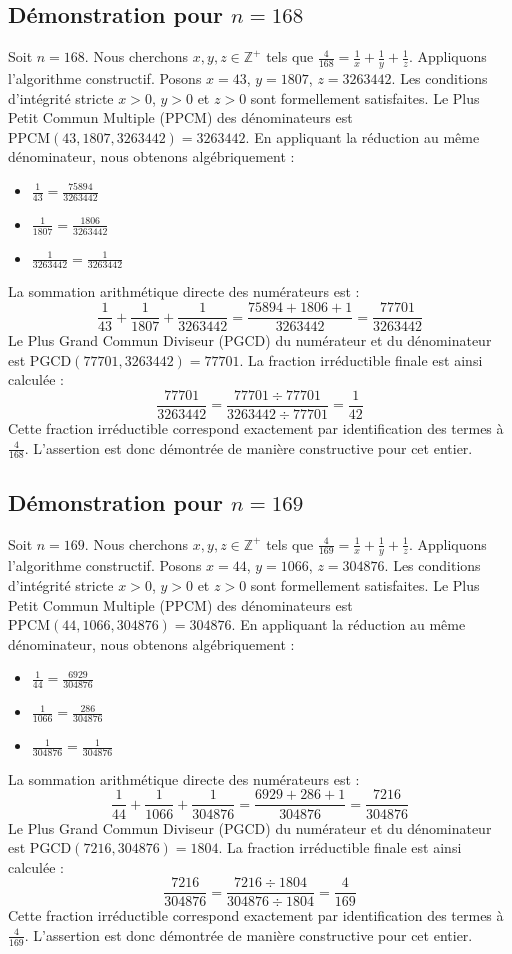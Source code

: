 \documentclass[11pt,a4paper]{article}
\begin{document}
\subsection{Démonstration pour $n = 168$}
Soit $n = 168$. Nous cherchons $x, y, z \in \mathbb{Z}^{+}$ tels que $\frac{4}{168} = \frac{1}{x} + \frac{1}{y} + \frac{1}{z}$.
Appliquons l'algorithme constructif. Posons $x = 43$, $y = 1807$, $z = 3263442$.
Les conditions d'intégrité stricte $x > 0$, $y > 0$ et $z > 0$ sont formellement satisfaites.
Le Plus Petit Commun Multiple (PPCM) des dénominateurs est $\text{PPCM}(43, 1807, 3263442) = 3263442$.
En appliquant la réduction au même dénominateur, nous obtenons algébriquement :
\begin{itemize}
    \item $\frac{1}{43} = \frac{75894}{3263442}$
    \item $\frac{1}{1807} = \frac{1806}{3263442}$
    \item $\frac{1}{3263442} = \frac{1}{3263442}$
\end{itemize}
La sommation arithmétique directe des numérateurs est :
$$ \frac{1}{43} + \frac{1}{1807} + \frac{1}{3263442} = \frac{75894 + 1806 + 1}{3263442} = \frac{77701}{3263442} $$
Le Plus Grand Commun Diviseur (PGCD) du numérateur et du dénominateur est $\text{PGCD}(77701, 3263442) = 77701$.
La fraction irréductible finale est ainsi calculée :
$$ \frac{77701}{3263442} = \frac{77701 \div 77701}{3263442 \div 77701} = \frac{1}{42} $$
Cette fraction irréductible correspond exactement par identification des termes à $\frac{4}{168}$. L'assertion est donc démontrée de manière constructive pour cet entier.

\subsection{Démonstration pour $n = 169$}
Soit $n = 169$. Nous cherchons $x, y, z \in \mathbb{Z}^{+}$ tels que $\frac{4}{169} = \frac{1}{x} + \frac{1}{y} + \frac{1}{z}$.
Appliquons l'algorithme constructif. Posons $x = 44$, $y = 1066$, $z = 304876$.
Les conditions d'intégrité stricte $x > 0$, $y > 0$ et $z > 0$ sont formellement satisfaites.
Le Plus Petit Commun Multiple (PPCM) des dénominateurs est $\text{PPCM}(44, 1066, 304876) = 304876$.
En appliquant la réduction au même dénominateur, nous obtenons algébriquement :
\begin{itemize}
    \item $\frac{1}{44} = \frac{6929}{304876}$
    \item $\frac{1}{1066} = \frac{286}{304876}$
    \item $\frac{1}{304876} = \frac{1}{304876}$
\end{itemize}
La sommation arithmétique directe des numérateurs est :
$$ \frac{1}{44} + \frac{1}{1066} + \frac{1}{304876} = \frac{6929 + 286 + 1}{304876} = \frac{7216}{304876} $$
Le Plus Grand Commun Diviseur (PGCD) du numérateur et du dénominateur est $\text{PGCD}(7216, 304876) = 1804$.
La fraction irréductible finale est ainsi calculée :
$$ \frac{7216}{304876} = \frac{7216 \div 1804}{304876 \div 1804} = \frac{4}{169} $$
Cette fraction irréductible correspond exactement par identification des termes à $\frac{4}{169}$. L'assertion est donc démontrée de manière constructive pour cet entier.
\end{document}
